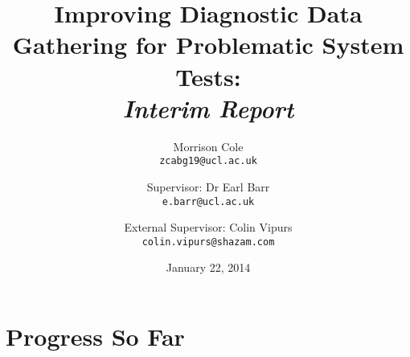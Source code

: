 
\setcounter{oldSectionCounter}{\value{section}}
\setcounter{oldPageCounter}{\value{page}}

\setcounter{section}{0}

\title{
	Improving Diagnostic Data Gathering for Problematic System Tests:\\
	\itshape{Interim Report}
}
\author{
	Morrison Cole\\
	\texttt{zcabg19@ucl.ac.uk}
	\and
	Supervisor: Dr Earl Barr\\
	\texttt{e.barr@ucl.ac.uk}
	\and
	External Supervisor: Colin Vipurs\\
	\texttt{colin.vipurs@shazam.com}
}
\date{January 22, 2014}

\maketitle

\section{Progress So Far}

